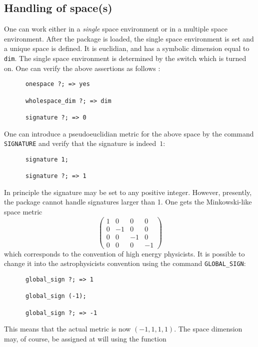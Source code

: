 \subsection{Handling of space(s)}
\hypertarget{switch:ONESPACE}{}
One can work either in a \emph{single} space environment or in
a multiple space environment. After the package is loaded, 
the single space environment is set and 
a unique space is defined. It is euclidian, and has a symbolic 
dimension equal to \texttt{dim}.
The single space environment is determined by the switch
 which is turned on. 
One can verify the above assertions as follows :
\begin{verbatim}
      onespace ?; => yes
      
      wholespace_dim ?; => dim

      signature ?; => 0
\end{verbatim}
One can introduce a pseudoeuclidian metric for the above space by the 
command \texttt{SIGNATURE} and 
verify that the signature is indeed~$1$:
\begin{verbatim}
      signature 1;

      signature ?; => 1
\end{verbatim}
In principle the signature may be set to any positive 
integer. However, presently,
the package cannot handle signatures larger than 1.
One gets the Minkowski-like space metric 
\begin{displaymath}
\left(\begin{array}{cccc}    
	1 & 0 & 0 & 0  \\
	0 & -1 & 0 & 0  \\
        0 & 0 & -1 & 0 \\
        0 & 0 & 0 & -1       
 \end{array}
\right)
\end{displaymath}
which corresponds to the convention of high energy physicists.
It is possible to change it into the  astrophysicists convention using 
the command  \texttt{GLOBAL\_SIGN}: 
\begin{verbatim}
      global_sign ?; => 1
      
      global_sign (-1);
 
      global_sign ?; => -1
\end{verbatim}
This means that the actual metric is now  $(-1,1,1,1)$.
The space dimension may, of course, be assigned at will using the function 
